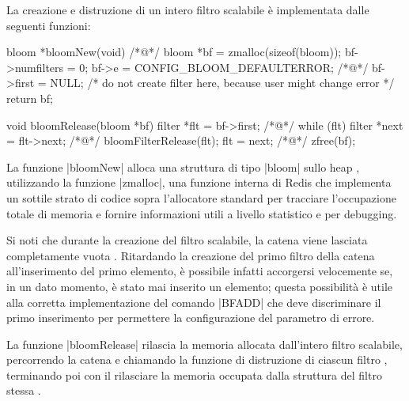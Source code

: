 La creazione e distruzione di un intero filtro scalabile è implementata dalle seguenti funzioni:

\begin{commentedsource}[style=csource,caption=Creazione e distruzione di un filtro scalabile]
bloom *bloomNew(void) {
/*@\lnote@*/	bloom *bf = zmalloc(sizeof(bloom));
	bf->numfilters = 0; 
    bf->e = CONFIG_BLOOM_DEFAULTERROR;
/*@\lnote@*/    bf->first = NULL; /* do not create filter here, because user might change error */ 
	return bf;
}

void bloomRelease(bloom *bf) {
    filter *flt = bf->first;
/*@\lnote@*/    while (flt) { 
        filter *next = flt->next;
/*@\lnote@*/        bloomFilterRelease(flt); 
        flt = next;
    }
/*@\lnote@*/    zfree(bf); 
}
\end{commentedsource}

La funzione \cverb|bloomNew| alloca una struttura di tipo \cverb|bloom| sullo heap ,
utilizzando la funzione \cverb|zmalloc|, una funzione interna di Redis che implementa un sottile
strato di codice sopra l'allocatore standard per tracciare l'occupazione totale di memoria e fornire
informazioni utili a livello statistico e per debugging.

Si noti che durante la creazione del filtro scalabile, la catena viene lasciata completamente vuota
. Ritardando la creazione del primo filtro della catena all'inserimento del primo elemento,
è possibile infatti accorgersi velocemente se, in un dato momento, è stato mai inserito un elemento;
questa possibilità è utile alla corretta implementazione del comando \cverb|BFADD| che deve
discriminare il primo inserimento per permettere la configurazione del parametro di errore.

La funzione \cverb|bloomRelease| rilascia la memoria allocata dall'intero filtro scalabile,
percorrendo la catena  e chiamando la funzione di distruzione di ciascun filtro ,
terminando poi con il rilasciare la memoria occupata dalla struttura del filtro stessa .

